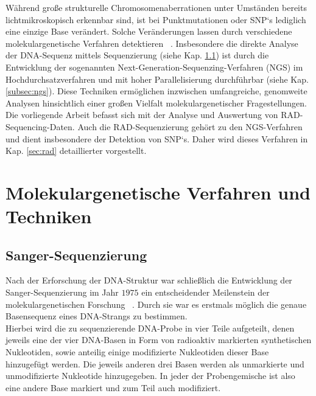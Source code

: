 Während große strukturelle Chromosomenaberrationen unter Umständen bereits lichtmikroskopisch erkennbar sind, ist bei Punktmutationen oder SNP‘s lediglich eine einzige Base verändert. Solche Veränderungen lassen durch verschiedene molekulargenetische Verfahren detektieren ~\cite{kwok_2003, wang_1998}. Insbesondere die direkte Analyse der DNA-Sequenz mittels Sequenzierung  (siehe Kap. \ref{subsec:sanger}) ist durch die Entwicklung der sogenannten Next-Generation-Sequenzing-Verfahren (NGS) im Hochdurchsatzverfahren und mit hoher Parallelisierung durchführbar (siehe Kap. \ref{subsec:ngs}). Diese Techniken ermöglichen inzwischen umfangreiche, genomweite Analysen hinsichtlich einer großen Vielfalt molekulargenetischer Fragestellungen. Die vorliegende Arbeit befasst sich mit der Analyse und Auswertung von RAD-Sequencing-Daten. Auch die RAD-Sequenzierung gehört zu den NGS-Verfahren und dient insbesondere der Detektion von SNP‘s. Daher wird dieses Verfahren in Kap. \ref{sec:rad} detaillierter vorgestellt.

\section{Molekulargenetische Verfahren und Techniken} \label{sec:methods}
\subsection{Sanger-Sequenzierung} \label{subsec:sanger}

Nach der Erforschung der DNA-Struktur war schließlich die Entwicklung der Sanger-Sequenzierung im Jahr $1975$ ein entscheidender Meilenstein der molekulargenetischen Forschung ~\cite{sanger_1975}. Durch sie war es erstmals möglich die genaue Basensequenz eines DNA-Strangs zu bestimmen. \\

Hierbei wird die zu sequenzierende DNA-Probe in vier Teile aufgeteilt, denen jeweils eine der vier DNA-Basen in Form von radioaktiv markierten synthetischen Nukleotiden, sowie anteilig einige modifizierte Nukleotiden dieser Base hinzugefügt werden. Die jeweils anderen drei Basen werden als unmarkierte und unmodifizierte Nukleotide hinzugegeben. In jeder der Probengemische ist also eine andere Base markiert und zum Teil auch modifiziert. \\


